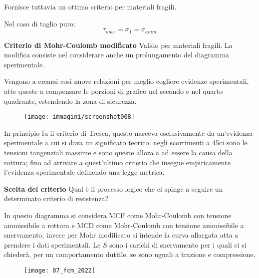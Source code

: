 \documentclass{article}
\begin{document}
\begin{adjustwidth}{2in}{}
 		Fornisce tuttavia un ottimo criterio per materiali fragili. \newline 
 		
 		Nel caso di taglio puro:
 		\[\tau_{max}=\sigma_1=\sigma_{amm}\]
 		
 		\textbf{{\Large Criterio di Mohr-Coulomb modificato}} \newline 
 		Valido per materiali fragili. La modifica consiste nel considerare anche un prolungamento del diagramma sperimentale. 
 		
 		Vengono a crearsi così nuove relazioni per meglio cogliere evidenze sperimentali, atte queste a compensare le porzioni di grafico nel secondo e nel quarto quadrante, estendendo la zona di sicurezza. 
 		
 		\begin{figure}[H]
 			\centering
 			\texttt{[image: immagini/screenshot008]}
 			\label{fig:screenshot008}
 		\end{figure}
 		
 		In principio fu il criterio di Tresca, questo nasceva esclusivamente da un'evidenza sperimentale a cui si dava un significato teorico: negli scorrimenti a 45\degree ci sono le tensioni tangenziali massime e sono queste allora a ad essere la causa della rottura; fino ad arrivare a quest'ultimo criterio che insegue empiricamente l'evidenza sperimentale definendo una legge metrica. \newline 
 		
 		\textbf{{\Large Scelta del criterio}} \newline 
 		Qual è il processo logico che ci spinge a seguire un determinato criterio di resistenza? 
 		
 		In questo diagramma si considera MCF come Mohr-Coulomb con tensione ammissibile a rottura e MCD come Mohr-Coulomb con tensione ammissibile a snervamento, invece per Mohr modificato si intende la curva allargata atta a prendere i dati sperimentali. Le $S$ sono i carichi di snervamento per i quali ci si chiederà, per un comportamento duttile, se sono uguali a trazione e compressione. 
 		
 	\end{adjustwidth}
 	\begin{figure}[H]
 	\texttt{[image: 07\_fcm\_2022]}
 	\end{figure}
\end{document}

